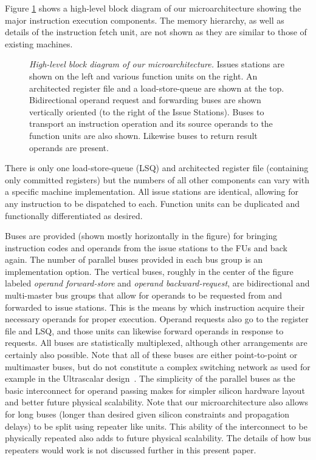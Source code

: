 \documentclass[10pt,twocolumn,dvips]{article}
\begin{document}
Figure \ref{fig:overview} shows a high-level block diagram
of our microarchitecture showing the major instruction execution components.
The memory hierarchy, as well as details of the instruction fetch
unit, are not shown as they are similar to those of existing
machines.
%
\begin{figure}
\caption{{\em High-level block diagram of our microarchitecture.} 
\small{
Issues stations are shown on the left and various function
units on the right.  An architected register file and a
load-store-queue are shown at the top.
Bidirectional operand request and forwarding buses are shown
vertically oriented (to the right of the Issue Stations).
Buses to transport an instruction operation and its source operands
to the function units are also shown. 
Likewise buses to return result operands are present.
}
}
\label{fig:overview}
\end{figure}
%
There is only one load-store-queue (LSQ) and
architected register file (containing only
committed registers) but the numbers of all other components can
vary with a specific machine implementation.
All issue stations are identical, allowing for any
instruction to be dispatched to each.
Function units can be duplicated and functionally differentiated
as desired. 

Buses are provided (shown mostly horizontally in the figure)
for bringing instruction codes and operands from the issue
stations to the FUs and back again.
The number of parallel buses provided in each bus group is
an implementation option.
The vertical buses, roughly in the center of the figure
labeled \textit{operand forward-store} and
\textit{operand backward-request}, are
bidirectional and multi-master bus groups that
allow for operands to be requested from and forwarded to
issue stations.
This is the means by which instruction acquire their necessary
operands for proper execution.
Operand requests also go to the register file and LSQ, and those units
can likewise forward operands in response to requests.
All buses are statistically multiplexed, although other
arrangements are certainly also possible.
Note that all of these buses are either point-to-point
or multimaster buses, but do not constitute a complex
switching network as used for example in the 
Ultrascalar design~\cite{henry99}.
The simplicity of the parallel buses as the basic interconnect
for operand passing makes for simpler silicon hardware layout
and better future physical scalability.
Note that our microarchitecture also allows for long buses
(longer than desired given silicon constraints and propagation
delays) to be split using repeater like units.
This ability of the interconnect to be physically repeated also
adds to future physical scalability.
The details of how bus repeaters would work is not discussed
further in this present paper.
\end{document}
